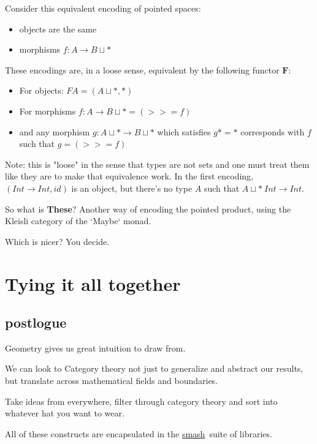 \documentclass[tikz]{beamer}
\theoremstyle{definition}
\begin{document}
\frame
{
	Consider this equivalent encoding of pointed spaces: 
	\begin{itemize}
		\item objects are the same
		\item morphisms $f : A \rightarrow B \sqcup *$
	\end{itemize}
	
}

\frame
{
	These encodings are, in a loose sense, equivalent by the following functor $\mathbf{F}$: 
	
	\begin{itemize}
		\item For objects: $FA = (A \sqcup *, *)$
		\item For morphisms $f : A \rightarrow B \sqcup * = (>>= f) $
		\item and any morphism $g : A \sqcup * \rightarrow B \sqcup *$ which satisfies $g* = *$ corresponds with $f$ such that $g = (>>= f)$ 
	\end{itemize}
}	

\frame
{
	Note: this is "loose" in the sense that types are not sets and one must treat them like they are to make that equivalence work. In the first encoding, $(Int \rightarrow Int, id)$ is an object, but there's no type $A$ such that $A \sqcup * ~ Int \rightarrow Int$.
}

\frame
{
	So what is \textbf{These}? Another way of encoding the pointed product, using the Kleisli category of the `Maybe` monad. 
}

\frame
{
	Which is nicer? You decide.
}

\section{Tying it all together}

\subsection{postlogue}
\frame
{
	Geometry gives us great intuition to draw from.
}

\frame
{
	We can look to Category theory not just to generalize and abstract our results, but translate across mathematical fields and boundaries. 
}

\frame
{
	Take ideas from everywhere, filter through category theory and sort into whatever hat you want to wear.
}

\frame
{
	All of these constructs are encapsulated in the \href{https://github.com/emilypi/smash}{smash} suite of libraries. 
}
\end{document}
